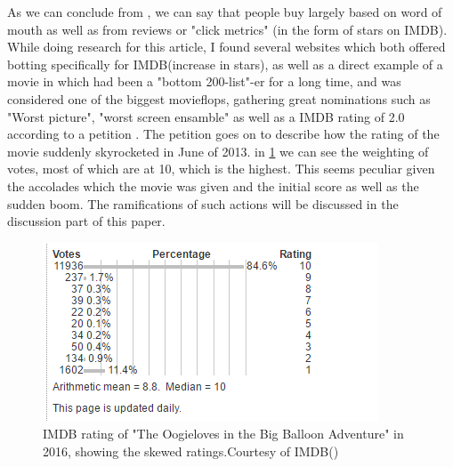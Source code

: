 \label{Emil:oogie}
As we can conclude from \cite{Bialecki2016}, we can say that people buy largely based on word of mouth as well as from reviews or "click metrics" (in the form of stars on IMDB). While doing research for this article, I found several websites which both offered botting specifically for IMDB(increase in stars), as well as a direct example of a movie in which had been a "bottom 200-list"-er for a long time, and was considered one of the biggest movieflops, gathering great nominations such as "Worst picture", "worst screen ensamble" \cite{emil:wiki:oogieacc} as well as a IMDB rating of 2.0 according to a petition \cite{Emil:change:Oogieloves}. The petition goes on to describe how the rating of the movie suddenly skyrocketed in June of 2013. in \ref{IMDB:rate} we can see the weighting of votes, most of which are at 10, which is the highest. This seems peculiar given the accolades which the movie was given and the initial score as well as the sudden boom. The ramifications of such actions will be discussed in the discussion part of this paper. 

\begin{figure}[h]\label{imdbratingCurve}
\centering
\includegraphics[scale=1]{fig/imdbstats.png}
\caption{IMDB rating of "The Oogieloves in the Big Balloon Adventure" in 2016, showing the skewed ratings.Courtesy of IMDB(\cite{IMDB:Oogieloves})}
\label{IMDB:rate}
\end{figure}

